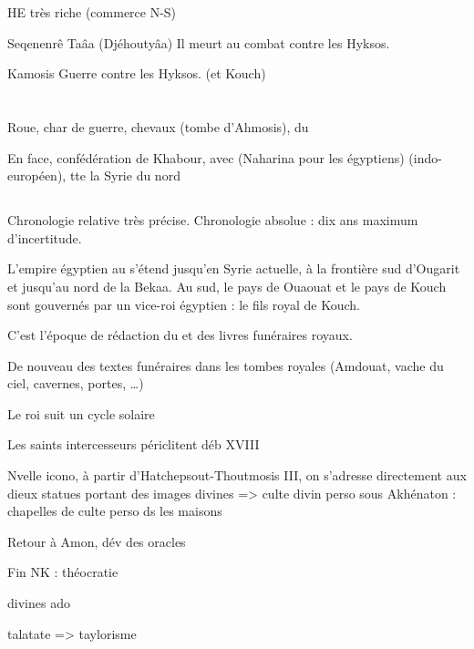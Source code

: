 HE très riche (commerce N-S)

\begin{listerois}
  \item [Seqenenrê Taâa (Djéhoutyâa)] Il meurt au combat contre 
        les Hyksos.
  \item [Kamosis] Guerre contre les Hyksos. (et Kouch)
\end{listerois}

\section{\NK}


Roue, char de guerre, chevaux (tombe d'Ahmosis), du \PO 

En face, confédération de Khabour, avec \Mtn (Naharina pour les 
égyptiens) (indo-européen), tte la Syrie du nord

\subsection{\texorpdfstring{}{XVIIIe dynastie}}

Chronologie relative très précise. Chronologie absolue : dix ans 
maximum d'incertitude.

L'empire égyptien au \PO s'étend jusqu'en Syrie actuelle, à la 
frontière sud d'Ougarit et jusqu'au nord de la Bekaa. 
Au sud, le pays de Ouaouat et le pays de Kouch sont gouvernés par un 
vice-roi égyptien : le fils royal de Kouch. 

C'est l'époque de rédaction du \LM et des livres funéraires royaux.

De nouveau des textes funéraires dans les tombes royales (Amdouat, 
vache du ciel, cavernes, portes, \dots)

Le roi suit un cycle solaire

Les saints intercesseurs périclitent déb XVIII

Nvelle icono, à partir d'Hatchepsout-Thoutmosis III, on s'adresse 
directement aux dieux
statues portant des images divines => \og culte divin perso \fg 
sous Akhénaton : chapelles de culte perso ds les maisons

Retour à Amon, dév des oracles

Fin NK : théocratie

divines ado

talatate => taylorisme


